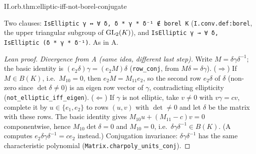 \begin{theorem}
\end{theorem}
\begin{tfformal}{II.orb.thm:elliptic-iff-not-borel-conjugate}
\begin{tffidelity}
Two clauses: \texttt{IsElliptic γ ↔ ∀ δ, δ * γ * δ⁻¹ ∉ borel K} (\texttt{I.conv.def:borel}, the upper triangular subgroup of $\mathrm{GL}_2(K)$), and \texttt{IsElliptic γ → ∀ δ, IsElliptic (δ * γ * δ⁻¹)}. As in A.
\end{tffidelity}
\end{tfformal}
\begin{proof}[Lean proof]
\emph{Divergence from A (same idea, different last step).} Write $M=\delta\gamma\delta^{-1}$; the basic identity is $(e_2\delta)\gamma=(e_2M)\delta$ (\texttt{row\_conj}, from $M\delta=\delta\gamma$). ($\Rightarrow$) If $M\in B(K)$, i.e.\ $M_{10}=0$, then $e_2M=M_{11}e_2$, so the second row $e_2\delta$ of $\delta$ (non-zero since $\det\delta\ne0$) is an eigen row vector of $\gamma$, contradicting ellipticity (\texttt{not\_elliptic\_iff\_eigen}). ($\Leftarrow$) If $\gamma$ is not elliptic, take $v\ne0$ with $v\gamma=cv$, complete it by $u\in\{e_1,e_2\}$ to rows $(u,v)$ with $\det\ne0$ and let $\delta$ be the matrix with these rows. The basic identity gives $M_{10}u+(M_{11}-c)v=0$ componentwise, hence $M_{10}\det\delta=0$ and $M_{10}=0$, i.e.\ $\delta\gamma\delta^{-1}\in B(K)$. (A computes $e_2\delta\gamma\delta^{-1}=ce_2$ instead.) Conjugation invariance: $\delta\gamma\delta^{-1}$ has the same characteristic polynomial (\texttt{Matrix.charpoly\_units\_conj}).
\end{proof}

